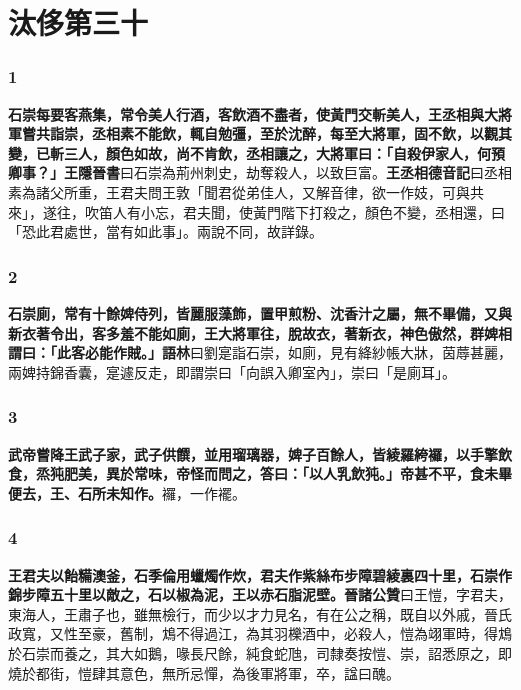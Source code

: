 \chapter{汰侈第三十}

\subsection*{1}

\textbf{石崇每要客燕集，常令美人行酒，客飲酒不盡者，使黃門交斬美人，王丞相與大將軍嘗共詣崇，丞相素不能飲，輒自勉彊，至於沈醉，每至大將軍，固不飲，以觀其變，已斬三人，顏色如故，尚不肯飲，丞相讓之，大將軍曰：「自殺伊家人，何預卿事？」}{\footnotesize \textbf{王隱晉書}曰石崇為荊州刺史，劫奪殺人，以致巨富。\textbf{王丞相德音記}曰丞相素為諸父所重，王君夫問王敦「聞君從弟佳人，又解音律，欲一作妓，可與共來」，遂往，吹笛人有小忘，君夫聞，使黃門階下打殺之，顏色不變，丞相還，曰「恐此君處世，當有如此事」。兩說不同，故詳錄。}

\subsection*{2}

\textbf{石崇廁，常有十餘婢侍列，皆麗服藻飾，置甲煎粉、沈香汁之屬，無不畢備，又與新衣著令出，客多羞不能如廁，王大將軍往，脫故衣，著新衣，神色傲然，群婢相謂曰：「此客必能作賊。」}{\footnotesize \textbf{語林}曰劉寔詣石崇，如廁，見有絳紗帳大牀，茵蓐甚麗，兩婢持錦香囊，寔遽反走，即謂崇曰「向誤入卿室內」，崇曰「是廁耳」。}

\subsection*{3}

\textbf{武帝嘗降王武子家，武子供饌，並用瑠璃器，婢子百餘人，皆綾羅絝𧟌，以手擎飲食，烝㹠肥美，異於常味，帝怪而問之，答曰：「以人乳飲㹠。」帝甚不平，食未畢便去，王、石所未知作。}{\footnotesize 𧟌，一作襬。}

\subsection*{4}

\textbf{王君夫以飴糒澳釜，石季倫用蠟燭作炊，君夫作紫絲布步障碧綾裏四十里，石崇作錦步障五十里以敵之，石以椒為泥，王以赤石脂泥壁。}{\footnotesize \textbf{晉諸公贊}曰王愷，字君夫，東海人，王肅子也，雖無檢行，而少以才力見名，有在公之稱，既自以外戚，晉氏政寬，又性至豪，舊制，鴆不得過江，為其羽櫟酒中，必殺人，愷為翊軍時，得鴆於石崇而養之，其大如鵝，喙長尺餘，純食蛇虺，司隸奏按愷、崇，詔悉原之，即燒於都街，愷肆其意色，無所忌憚，為後軍將軍，卒，諡曰醜。}

